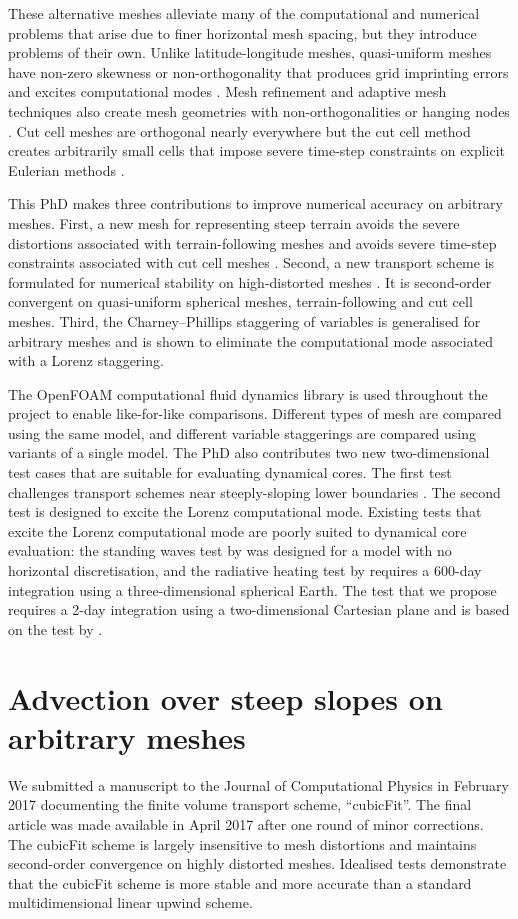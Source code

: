 \documentclass[a4paper,11pt]{article}
\begin{document}
These alternative meshes alleviate many of the computational and numerical problems that arise due to finer horizontal mesh spacing, but they introduce problems of their own.
Unlike latitude-longitude meshes, quasi-uniform meshes have non-zero skewness or non-orthogonality that produces grid imprinting errors and excites computational modes \citep{weller2012}.
Mesh refinement and adaptive mesh techniques also create mesh geometries with non-orthogonalities or hanging nodes \citep{marras2016}.
Cut cell meshes are orthogonal nearly everywhere but the cut cell method creates arbitrarily small cells that impose severe time-step constraints on explicit Eulerian methods \citep{klein2009}.

This PhD makes three contributions to improve numerical accuracy on arbitrary meshes.  First, a new mesh for representing steep terrain avoids the severe distortions associated with terrain-following meshes \citep{shaw-weller2016} and avoids severe time-step constraints associated with cut cell meshes \citep{shaw2017}.  Second, a new transport scheme is formulated for numerical stability on high-distorted meshes \citep{shaw2017}.  It is second-order convergent on quasi-uniform spherical meshes, terrain-following and cut cell meshes.
Third, the Charney--Phillips staggering of variables is generalised for arbitrary meshes and is shown to eliminate the computational mode associated with a Lorenz staggering.

The OpenFOAM computational fluid dynamics library is used throughout the project to enable like-for-like comparisons.  Different types of mesh are compared using the same model, and different variable staggerings are compared using variants of a single model.
The PhD also contributes two new two-dimensional test cases that are suitable for evaluating dynamical cores.  The first test challenges transport schemes near steeply-sloping lower boundaries \citep{shaw2017}.
The second test is designed to excite the Lorenz computational mode.  Existing tests that excite the Lorenz computational mode are poorly suited to dynamical core evaluation: the standing waves test by \citet{arakawa-konor1996} was designed for a model with no horizontal discretisation, and the radiative heating test by \cite{untch-hortal2004} requires a 600-day integration using a three-dimensional spherical Earth.  The test that we propose requires a 2-day integration using a two-dimensional Cartesian plane and is based on the test by \citet{arakawa-konor1996}.


\section{Advection over steep slopes on arbitrary meshes}
We submitted a manuscript to the Journal of Computational Physics in February 2017 documenting the finite volume transport scheme, ``cubicFit''.  The final article \citep{shaw2017} was made available in April 2017 after one round of minor corrections.  The cubicFit scheme is largely insensitive to mesh distortions and maintains second-order convergence on highly distorted meshes.  Idealised tests demonstrate that the cubicFit scheme is more stable and more accurate than a standard multidimensional linear upwind scheme.
\end{document}
